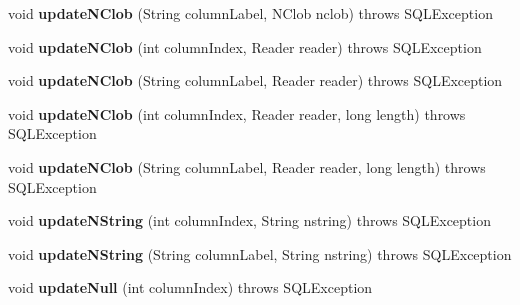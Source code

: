 \begin{DoxyCompactItemize}
\item 
\mbox{\label{classsimpledb_1_1jdbc_1_1ResultSetAdapter_ac17cd2d2e8afcb7e50fbd604dabff242}} 
void {\bfseries update\+N\+Clob} (String column\+Label, N\+Clob nclob)  throws S\+Q\+L\+Exception 
\item 
\mbox{\label{classsimpledb_1_1jdbc_1_1ResultSetAdapter_a72d0ae0dfe75aa83510c59236820d53f}} 
void {\bfseries update\+N\+Clob} (int column\+Index, Reader reader)  throws S\+Q\+L\+Exception 
\item 
\mbox{\label{classsimpledb_1_1jdbc_1_1ResultSetAdapter_a564dc9c6e23d14f88aa2a34d9a4112fe}} 
void {\bfseries update\+N\+Clob} (String column\+Label, Reader reader)  throws S\+Q\+L\+Exception 
\item 
\mbox{\label{classsimpledb_1_1jdbc_1_1ResultSetAdapter_a09d66267038cae3b258da8c2b156eebf}} 
void {\bfseries update\+N\+Clob} (int column\+Index, Reader reader, long length)  throws S\+Q\+L\+Exception 
\item 
\mbox{\label{classsimpledb_1_1jdbc_1_1ResultSetAdapter_a57dc8584580a88ec449081e0066e943b}} 
void {\bfseries update\+N\+Clob} (String column\+Label, Reader reader, long length)  throws S\+Q\+L\+Exception 
\item 
\mbox{\label{classsimpledb_1_1jdbc_1_1ResultSetAdapter_ae736f2240da266961f6d4c679625567d}} 
void {\bfseries update\+N\+String} (int column\+Index, String nstring)  throws S\+Q\+L\+Exception 
\item 
\mbox{\label{classsimpledb_1_1jdbc_1_1ResultSetAdapter_abca233a9d9dfe3837a01f4c34a6b678d}} 
void {\bfseries update\+N\+String} (String column\+Label, String nstring)  throws S\+Q\+L\+Exception 
\item 
\mbox{\label{classsimpledb_1_1jdbc_1_1ResultSetAdapter_abc73d26b08cd35e643aa41a76209657a}} 
void {\bfseries update\+Null} (int column\+Index)  throws S\+Q\+L\+Exception 

\end{DoxyCompactItemize}
